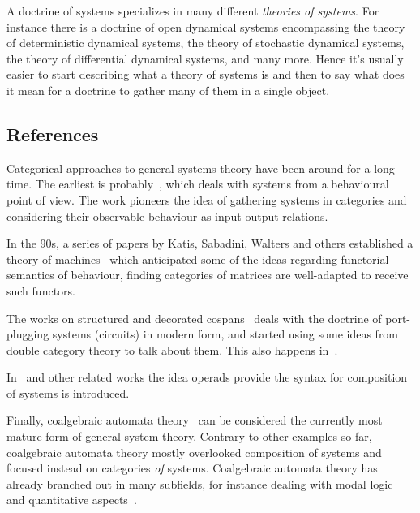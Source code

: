A doctrine of systems specializes in many different \emph{theories of systems}. For instance there is a doctrine of open dynamical systems encompassing the theory of deterministic dynamical systems, the theory of stochastic dynamical systems, the theory of differential dynamical systems, and many more.
Hence it's usually easier to start describing what a theory of systems is and then to say what does it mean for a doctrine to gather many of them in a single object.

\subsection{References}
Categorical approaches to general systems theory have been around for a long time.
The earliest is probably~\cite{rosen1978fundamentals}, which deals with systems from a behavioural point of view. The work pioneers the idea of gathering systems in categories and considering their observable behaviour as input-output relations.

In the 90s, a series of papers by Katis, Sabadini, Walters and others established a theory of machines~\cite{sabadini_functions_1993, bloom_matrices_1996, katis1997bicategories, katis1997span, katis_algebra_1999, katis2002feedback} which anticipated some of the ideas regarding functorial semantics of behaviour, finding categories of matrices are well-adapted to receive such functors.

The works on structured and decorated cospans~\cite{fiadeiro2007structured,fong2015decorated, baez2020open,baez2020structured,Baez2022structuredversus} deals with the doctrine of port-plugging systems (circuits) in modern form, and started using some ideas from double category theory to talk about them.
This also happens in~\cite{lerman2018networks,culbertson2020formal}.

In~\cite{spivak2013operad, libkind2021operadic} and other related works the idea operads provide the syntax for composition of systems is introduced.

Finally, coalgebraic automata theory~\cite{goos_relational_1977,rutten_universal_2000,kupke_coalgebraic_2008,jacobs_introduction_2017} can be considered the currently most mature form of general system theory.
Contrary to other examples so far, coalgebraic automata theory mostly overlooked composition of systems and focused instead on categories \emph{of} systems.
Coalgebraic automata theory has already branched out in many subfields, for instance dealing with modal logic~\cite{?} and quantitative aspects~\cite{?}.

